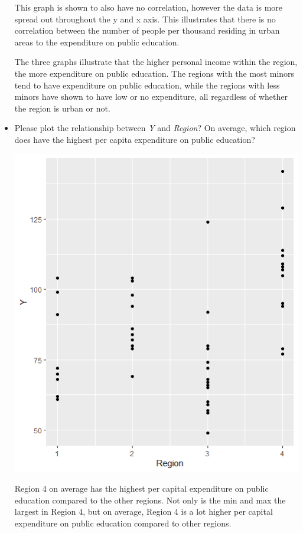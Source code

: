 \documentclass[12pt,letterpaper]{article}
\begin{document}
\begin{itemize}
This graph is shown to also have no correlation, however the data is more spread out throughout the y and x axis. This illustrates that there is no correlation between the number of people per thousand residing in urban areas to the expenditure on public education. 

The three graphs illustrate that the higher personal income within the region, the more expenditure on public education. The regions with the most minors tend to have expenditure on public education, while the regions with less minors have shown to have low or no expenditure, all regardless of whether the region is urban or not. 

\item
Please plot the relationship between \emph{Y} and \emph{Region}? On average, which region does have the highest per capita expenditure on public education?



\includegraphics{Y vs Region}

Region 4 on average has the highest per capital expenditure on public education compared to the other regions. Not only is the min and max the largest in Region 4, but on average, Region 4 is a lot higher per capital expenditure on public education compared to other regions. 


\end{itemize}
\end{document}
